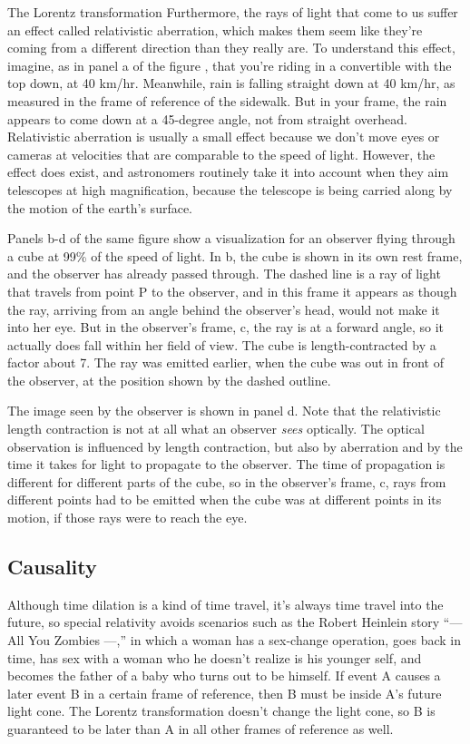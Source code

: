 \begin{section}{The Lorentz transformation}
Furthermore, the rays of light that come to us suffer an effect called relativistic aberration, which makes them seem
like they're coming from a different direction than they really are. To understand this effect, imagine, as in
panel a of the figure , that you're
riding in a convertible with the top down, at 40 km/hr. Meanwhile, rain is falling straight down at 40 km/hr, as measured
in the frame of reference of the sidewalk. But in your frame, the rain appears to come down at a 45-degree angle, not
from straight overhead. Relativistic aberration is usually a small effect because we don't move eyes or cameras at
velocities that are comparable to the speed of light. However, the effect does exist, and astronomers routinely take
it into account when they aim telescopes at high magnification, because the telescope is being carried along by the
motion of the earth's surface.

\pagebreak

Panels b-d of the same figure show a visualization for an observer flying through a cube at 99\% of the speed of light.
In b, the cube is shown in its own rest frame, and
the observer has already passed through. The dashed line is a ray of light that travels
from point P to the observer, and in this frame it appears as though the ray,
arriving from an angle behind the observer's head, would not make it into
her eye.   
But in the observer's frame, c, the ray is at a forward angle,
so it actually does fall within her field of view.
The cube is length-contracted by a factor about 7.
The ray was emitted earlier, when the cube was out in front of the observer, at the position
shown by the dashed outline.

The image seen by the
observer is shown in panel d.
Note that the relativistic length contraction is not at all
what an observer \emph{sees} optically. The optical observation is influenced by length contraction,
but also by aberration and by the time it takes for light to propagate to the observer. The time
of propagation is different for different parts of the cube, so in the observer's frame,
c, rays from different points had to be emitted when the cube was at different
points in its motion, if those rays were to reach the eye.

\section{Causality}

Although time dilation is a kind of time travel, it's always time travel into the future,
so special relativity avoids scenarios such as the Robert Heinlein story ``--- All You Zombies ---,''
in which a woman has a sex-change operation, goes back in time, has sex with a woman who he doesn't
realize is his younger self, and becomes the father of a baby who turns out to be himself. If event A causes
a later event B in a certain frame of reference, then B must be inside A's future light cone. The Lorentz
transformation doesn't change the light cone, so B is guaranteed to be later than A in all other frames
of reference as well.


\end{section}

